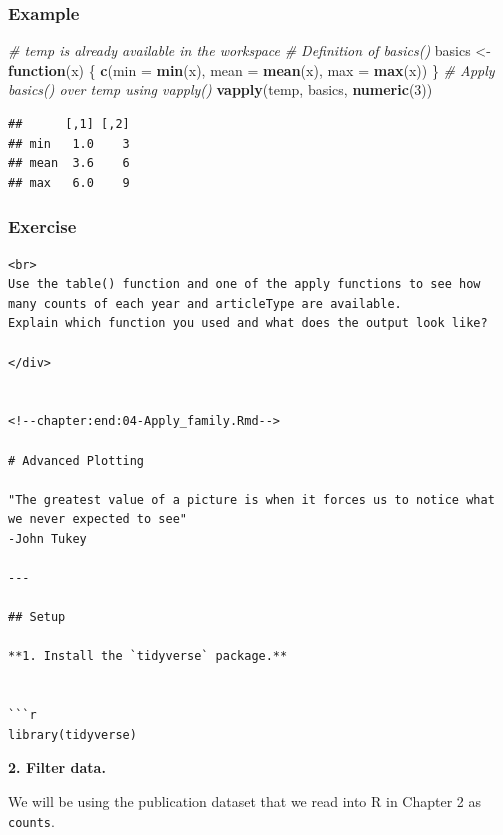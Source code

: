 \documentclass[
]{book}
\newenvironment{Shaded}{\begin{snugshade}}{\end{snugshade}}
\newcommand{\CommentTok}[1]{\textcolor[rgb]{0.56,0.35,0.01}{\textit{#1}}}
\newcommand{\ControlFlowTok}[1]{\textcolor[rgb]{0.13,0.29,0.53}{\textbf{#1}}}
\newcommand{\DataTypeTok}[1]{\textcolor[rgb]{0.13,0.29,0.53}{#1}}
\newcommand{\DecValTok}[1]{\textcolor[rgb]{0.00,0.00,0.81}{#1}}
\newcommand{\KeywordTok}[1]{\textcolor[rgb]{0.13,0.29,0.53}{\textbf{#1}}}
\newcommand{\NormalTok}[1]{#1}
\newcommand{\StringTok}[1]{\textcolor[rgb]{0.31,0.60,0.02}{#1}}
\begin{document}
\hypertarget{example-7}{%
\subsubsection{Example}\label{example-7}}

\begin{Shaded}
\begin{Highlighting}[]
\CommentTok{# temp is already available in the workspace}
\CommentTok{# Definition of basics()}
\NormalTok{basics <-}\StringTok{ }\ControlFlowTok{function}\NormalTok{(x) \{}
  \KeywordTok{c}\NormalTok{(}\DataTypeTok{min =} \KeywordTok{min}\NormalTok{(x), }\DataTypeTok{mean =} \KeywordTok{mean}\NormalTok{(x), }\DataTypeTok{max =} \KeywordTok{max}\NormalTok{(x))}
\NormalTok{\}}
\CommentTok{# Apply basics() over temp using vapply()}
\KeywordTok{vapply}\NormalTok{(temp, basics, }\KeywordTok{numeric}\NormalTok{(}\DecValTok{3}\NormalTok{))}
\end{Highlighting}
\end{Shaded}

\begin{verbatim}
##      [,1] [,2]
## min   1.0    3
## mean  3.6    6
## max   6.0    9
\end{verbatim}

\hypertarget{exercise-2}{%
\subsubsection{Exercise}\label{exercise-2}}

\begin{verbatim}
<br>
Use the table() function and one of the apply functions to see how many counts of each year and articleType are available. 
Explain which function you used and what does the output look like?

</div>


<!--chapter:end:04-Apply_family.Rmd-->

# Advanced Plotting 

"The greatest value of a picture is when it forces us to notice what we never expected to see"
-John Tukey

---

## Setup

**1. Install the `tidyverse` package.**


```r
library(tidyverse)
\end{verbatim}

\textbf{2. Filter data.}

We will be using the publication dataset that we read into R in Chapter 2 as \texttt{counts}.
\end{document}
